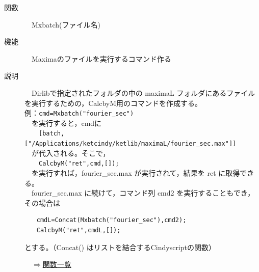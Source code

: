\documentclass[papersize,a4paper,12pt,uplatex]{jsarticle}
\begin{document}
\begin{description}
\hypertarget{mxbatch}{}
\item[関数]　Mxbatch(ファイル名)
\item[機能]　Maximaのファイルを実行するコマンド作る
\item[説明]　Dirlibで指定されたフォルダの中の maximaL フォルダにあるファイルを実行するための，CalcbyM用のコマンドを作成する。\\
例：\verb|cmd=Mxbatch("fourier_sec")|\\
　を実行すると，cmdに\\
　　\verb|[batch,["/Applications/ketcindy/ketlib/maximaL/fourier_sec.max"]] |\\
　が代入される。そこで，\\
　　\verb|CalcbyM("ret",cmd,[]);|\\
　を実行すれば，fourier\_sec.max が実行されて，結果を ret に取得できる。\\
　fourier\_sec.max に続けて，コマンド列 cmd2 を実行することもでき，その場合は
\begin{verbatim}
　　cmdL=Concat(Mxbatch("fourier_sec"),cmd2);
　　CalcbyM("ret",cmdL,[]);
\end{verbatim}
とする。（Concat() はリストを結合するCindyscriptの関数）\\
\begin{flushright}　\hyperlink{functionlist}{$\Rightarrow$関数一覧}\end{flushright}
　\\


\end{description}
\end{document}
